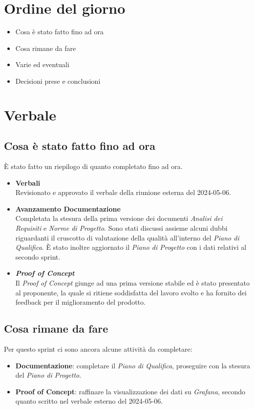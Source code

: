 \documentclass[italian,12pt]{article}
\begin{document}
\section{Ordine del giorno}
\begin{itemize}
	\item Cosa è stato fatto fino ad ora
	\item Cosa rimane da fare
	\item Varie ed eventuali
	\item Decisioni prese e conclusioni
\end{itemize}

\newpage

\section{Verbale}

\subsection{Cosa è stato fatto fino ad ora}
È stato fatto un riepilogo di quanto completato fino ad ora.
\begin{itemize}
	\item \textbf{Verbali} \\
	      Revisionato e approvato il verbale della riunione esterna del 2024-05-06.
	\item \textbf{Avanzamento Documentazione} \\
	      Completata la stesura della prima versione dei documenti \textit{Analisi dei Requisiti} e
	      \textit{Norme di Progetto}. Sono stati discussi assieme alcuni dubbi
	      riguardanti il cruscotto di valutazione della qualità all'interno del \textit{Piano di Qualifica}.
	      È stato inoltre aggiornato il \textit{Piano di Progetto} con i dati relativi al secondo sprint.
	\item \textbf{\textit{Proof of Concept}}\\
	      Il \textit{Proof of Concept} giunge ad una prima versione stabile ed è stato presentato al proponente,
	      la quale si ritiene soddisfatta del lavoro svolto e ha fornito dei feedback per il miglioramento del prodotto.
\end{itemize}

\subsection{Cosa rimane da fare}
Per questo sprint ci sono ancora alcune attività da completare:
\begin{itemize}
	\item \textbf{Documentazione}: completare il \textit{Piano di Qualifica}, proseguire con la stesura del \textit{Piano di Progetto}.
	\item \textbf{Proof of Concept}: raffinare la visualizzazione dei dati su \textit{Grafana}, secondo quanto scritto nel verbale esterno del 2024-05-06.
\end{itemize}
\end{document}
